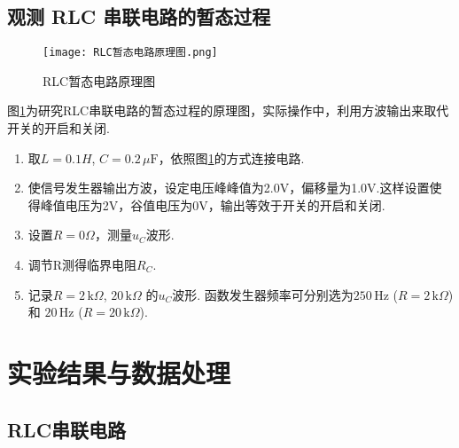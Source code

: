\documentclass[11pt]{article}
\newcommand{\unit}[1]{\,\mathrm{#1}}
\newcommand{\cunit}[1]{\,#1} %
\begin{document}
\subsection{观测 RLC 串联电路的暂态过程}
\begin{figure}[htbp]
	\centering
	\texttt{[image: RLC暂态电路原理图.png]}
	\caption{RLC暂态电路原理图}
	\label{fig:暂态}
\end{figure}
图\ref{fig:暂态}为研究RLC串联电路的暂态过程的原理图，实际操作中，利用方波输出来取代开关的开启和关闭.
\begin{enumerate}
	\item 取$L =0.1 H$, $C =0.2 \cunit{\mu\mathrm{F}}$，依照图\ref{fig:暂态}的方式连接电路.
	\item 使信号发生器输出方波，设定电压峰峰值为2.0V，偏移量为1.0V.这样设置使得峰值电压为2V，谷值电压为0V，输出等效于开关的开启和关闭.
	\item 设置$R=0\Omega$，测量$u_C$波形.
	\item 调节R测得临界电阻$R_C$.
	\item 记录$R=2 \cunit{\mathrm{k}\Omega}$, $20 \cunit{\mathrm{k}\Omega}$ 的$u_C$波形. 函数发生器频率可分别选为$250 \unit{Hz}$ ($R=2 \cunit{\mathrm{k}\Omega}$) 和 $20 \unit{Hz}$ ($R=20 \cunit{\mathrm{k}\Omega}$). 
\end{enumerate}



\section{实验结果与数据处理}

\subsection{RLC串联电路}
\end{document}
